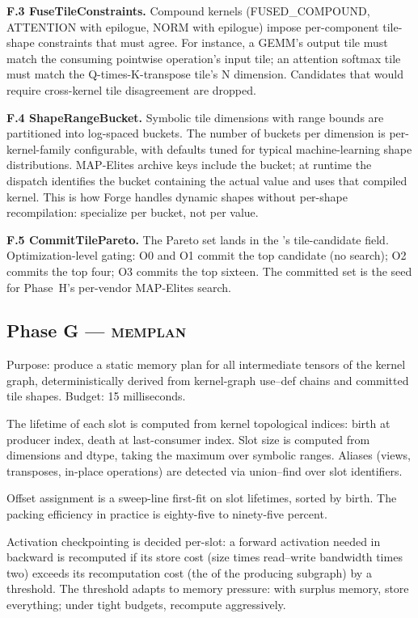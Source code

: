 \textbf{F.3 FuseTileConstraints.}
Compound kernels (FUSED\_COMPOUND, ATTENTION with epilogue, NORM with epilogue) impose per-component tile-shape constraints that must agree.
For instance, a GEMM's output tile must match the consuming pointwise operation's input tile; an attention softmax tile must match the Q-times-K-transpose tile's N dimension.
Candidates that would require cross-kernel tile disagreement are dropped.

\textbf{F.4 ShapeRangeBucket.}
Symbolic tile dimensions with range bounds are partitioned into log-spaced buckets.
The number of buckets per dimension is per-kernel-family configurable, with defaults tuned for typical machine-learning shape distributions.
MAP-Elites archive keys include the bucket; at runtime the dispatch identifies the bucket containing the actual value and uses that compiled kernel.
This is how Forge handles dynamic shapes without per-shape recompilation: specialize per bucket, not per value.

\textbf{F.5 CommitTilePareto.}
The Pareto set lands in the 's tile-candidate field.
Optimization-level gating: O0 and O1 commit the top candidate (no search); O2 commits the top four; O3 commits the top sixteen.
The committed set is the seed for Phase~H's per-vendor MAP-Elites search.

\subsection{Phase G --- \textsc{memplan}}
\label{sec:forge-phase-g}

Purpose: produce a static memory plan for all intermediate tensors of the  kernel graph, deterministically derived from kernel-graph use--def chains and committed tile shapes.
Budget: 15 milliseconds.

The lifetime of each slot is computed from kernel topological indices: birth at producer index, death at last-consumer index.
Slot size is computed from  dimensions and dtype, taking the maximum over symbolic ranges.
Aliases (views, transposes, in-place operations) are detected via union--find over slot identifiers.

Offset assignment is a sweep-line first-fit on slot lifetimes, sorted by birth.
The packing efficiency in practice is eighty-five to ninety-five percent.

Activation checkpointing is decided per-slot: a forward activation needed in backward is recomputed if its store cost (size times read--write bandwidth times two) exceeds its recomputation cost (the  of the producing subgraph) by a threshold.
The threshold adapts to memory pressure: with surplus memory, store everything; under tight budgets, recompute aggressively.

